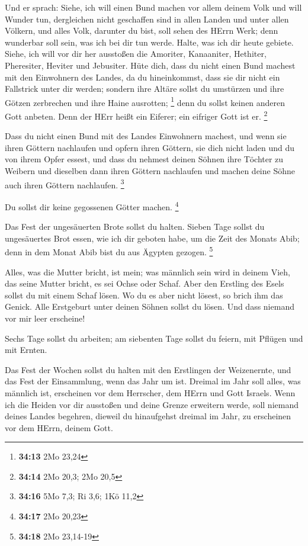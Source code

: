  Und er sprach: Siehe, ich will einen Bund machen vor allem
deinem Volk und will Wunder tun, dergleichen nicht geschaffen sind in
allen Landen und unter allen Völkern, und alles Volk, darunter du bist,
soll sehen des HErrn Werk; denn wunderbar soll sein, was ich bei dir tun
werde.  Halte, was ich dir heute gebiete. Siehe, ich will
vor dir her ausstoßen die Amoriter, Kanaaniter, Hethiter, Pheresiter,
Heviter und Jebusiter.  Hüte dich, dass du nicht einen Bund
machest mit den Einwohnern des Landes, da du hineinkommst, dass sie dir
nicht ein Fallstrick unter dir werden;  sondern ihre Altäre
sollst du umstürzen und ihre Götzen zerbrechen und ihre Haine ausrotten;
\footnote{\textbf{34:13} 2Mo 23,24}  denn du sollst keinen
anderen Gott anbeten. Denn der HErr heißt ein Eiferer; ein eifriger Gott
ist er. \footnote{\textbf{34:14} 2Mo 20,3; 2Mo 20,5}

 Dass du nicht einen Bund mit des Landes Einwohnern
machest, und wenn sie ihren Göttern nachlaufen und opfern ihren Göttern,
sie dich nicht laden und du von ihrem Opfer essest,  und
dass du nehmest deinen Söhnen ihre Töchter zu Weibern und dieselben dann
ihren Göttern nachlaufen und machen deine Söhne auch ihren Göttern
nachlaufen. \footnote{\textbf{34:16} 5Mo 7,3; Ri 3,6; 1Kö 11,2}

 Du sollst dir keine gegossenen Götter machen. \footnote{\textbf{34:17}
  2Mo 20,23}

 Das Fest der ungesäuerten Brote sollst du halten. Sieben
Tage sollst du ungesäuertes Brot essen, wie ich dir geboten habe, um die
Zeit des Monats Abib; denn in dem Monat Abib bist du aus Ägypten
gezogen. \footnote{\textbf{34:18} 2Mo 23,14-19}

 Alles, was die Mutter bricht, ist mein; was männlich sein
wird in deinem Vieh, das seine Mutter bricht, es sei Ochse oder Schaf.
 Aber den Erstling des Esels sollst du mit einem Schaf
lösen. Wo du es aber nicht lösest, so brich ihm das Genick. Alle
Erstgeburt unter deinen Söhnen sollst du lösen. Und dass niemand vor mir
leer erscheine!

 Sechs Tage sollst du arbeiten; am siebenten Tage sollst du
feiern, mit Pflügen und mit Ernten.

 Das Fest der Wochen sollst du halten mit den Erstlingen
der Weizenernte, und das Fest der Einsammlung, wenn das Jahr um ist.
 Dreimal im Jahr soll alles, was männlich ist, erscheinen
vor dem Herrscher, dem HErrn und Gott Israels.  Wenn ich
die Heiden vor dir ausstoßen und deine Grenze erweitern werde, soll
niemand deines Landes begehren, dieweil du hinaufgehst dreimal im Jahr,
zu erscheinen vor dem HErrn, deinem Gott.

